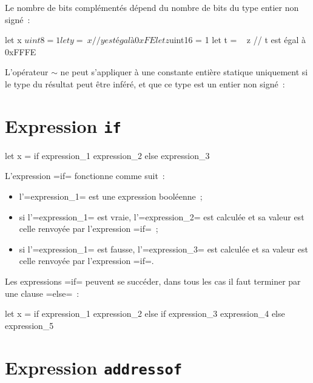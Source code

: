 Le nombre de bits complémentés dépend du nombre de bits du type entier non signé~:
\begin{PLM}
let x $uint8 = 1
let y = ~ x // y est égal à 0xFE
let z $uint16 = 1
let t = ~ z // t est égal à 0xFFFE
\end{PLM}

L'opérateur $\sim$ ne peut s'appliquer à une constante entière statique uniquement si le type du résultat peut être inféré, et que ce type est un entier non signé~:





\section{Expression \texttt{if}}

\begin{PLM}
let x = if expression_1 { expression_2 } else { expression_3 }
\end{PLM}

L'expression \plm=if= fonctionne comme suit~:
\begin{itemize}
  \item l'\plm=expression_1= est une expression booléenne~;
  \item si l'\plm=expression_1= est vraie, l'\plm=expression_2= est calculée et sa valeur est celle renvoyée par l'expression \plm=if=~;
  \item si l'\plm=expression_1= est fausse, l'\plm=expression_3= est calculée et sa valeur est celle renvoyée par l'expression \plm=if=.
\end{itemize}

Les expressions \plm=if= peuvent se succéder, dans tous les cas il faut terminer par une clause \plm=else=~:

\begin{PLM}
let x =
  if expression_1 {
    expression_2
  }else if expression_3 {
    expression_4
  }else{
    expression_5
  }
\end{PLM}



\section{Expression \texttt{addressof}}


